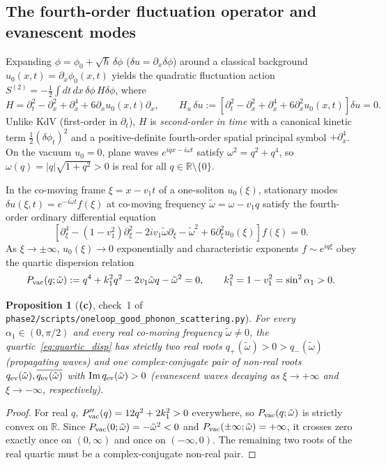 \documentclass[11pt,a4paper]{article}
\newcommand{\Lc}{\textsf{\textbf{(c)}}}
\newcommand{\script}[1]{\texttt{phase2/\allowbreak scripts/\allowbreak #1}}
\newtheorem{proposition}{Proposition}[section]
\theoremstyle{remark}
\begin{document}
\subsection{The fourth-order fluctuation operator and evanescent modes}

Expanding $\phi=\phi_0+\sqrt{\hbar}\,\delta\phi$ ($\delta u=\partial_x\delta\phi$) around a classical background $u_0(x,t)=\partial_x\phi_0(x,t)$ yields the quadratic fluctuation action $S^{(2)}=-\frac12\int dt\,dx\,\delta\phi\,H\delta\phi$, where
\begin{equation}\label{eq:H_phi}
H=\partial_t^2-\partial_x^2+\partial_x^4+6\partial_x u_0(x,t)\partial_x,\qquad
H_u\,\delta u:=\left[\partial_t^2-\partial_x^2+\partial_x^4+6\partial_x^2 u_0(x,t)\right]\delta u=0.
\end{equation}
Unlike KdV (first-order in $\partial_t$), $H$ is \emph{second-order in time} with a canonical kinetic term $\tfrac12(\delta\phi_t)^2$ and a positive-definite fourth-order spatial principal symbol $+\partial_x^4$. On the vacuum $u_0=0$, plane waves $e^{iqx-i\omega t}$ satisfy $\omega^2=q^2+q^4$, so $\omega(q)=|q|\sqrt{1+q^2}>0$ is real for all $q\in\mathbb{R}\setminus\{0\}$.

In the co-moving frame $\xi=x-v_1 t$ of a one-soliton $u_0(\xi)$, stationary modes $\delta u(\xi,t)=e^{-i\tilde\omega t}f(\xi)$ at co-moving frequency $\tilde\omega=\omega-v_1 q$ satisfy the fourth-order ordinary differential equation
\begin{equation}\label{eq:comoving_ode}
\left[\partial_\xi^4-(1-v_1^2)\partial_\xi^2-2iv_1\tilde\omega\partial_\xi-\tilde\omega^2+6\partial_\xi^2 u_0(\xi)\right]f(\xi)=0.
\end{equation}
As $\xi\to\pm\infty$, $u_0(\xi)\to 0$ exponentially and characteristic exponents $f\sim e^{iq\xi}$ obey the quartic dispersion relation
\begin{equation}\label{eq:quartic_disp}
P_{\rm vac}(q;\tilde\omega):=q^4+k_1^2 q^2-2v_1\tilde\omega q-\tilde\omega^2=0,\qquad k_1^2=1-v_1^2=\sin^2\alpha_1>0.
\end{equation}

\begin{proposition}[\Lc, check~1 of \script{oneloop\_good\_phonon\_scattering.py}]\label{prop:disp_roots}
For every $\alpha_1\in(0,\pi/2)$ and every real co-moving frequency $\tilde\omega\neq 0$, the quartic~\eqref{eq:quartic_disp} has \emph{strictly two real roots} $q_+(\tilde\omega)>0>q_-(\tilde\omega)$ (propagating waves) and \emph{one complex-conjugate pair of non-real roots} $q_{\rm ev}(\tilde\omega),\overline{q_{\rm ev}(\tilde\omega)}$ with $\operatorname{Im}q_{\rm ev}(\tilde\omega)>0$ (evanescent waves decaying as $\xi\to+\infty$ and $\xi\to-\infty$, respectively).
\end{proposition}
\begin{proof}
For real $q$, $P_{\rm vac}''(q)=12q^2+2k_1^2>0$ everywhere, so $P_{\rm vac}(q;\tilde\omega)$ is strictly convex on $\mathbb{R}$. Since $P_{\rm vac}(0;\tilde\omega)=-\tilde\omega^2<0$ and $P_{\rm vac}(\pm\infty;\tilde\omega)=+\infty$, it crosses zero exactly once on $(0,\infty)$ and once on $(-\infty,0)$. The remaining two roots of the real quartic must be a complex-conjugate non-real pair.
\end{proof}
\end{document}
